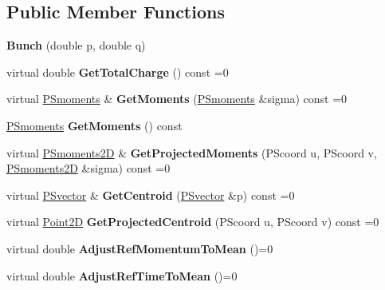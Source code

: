 \subsection*{Public Member Functions}
\begin{DoxyCompactItemize}
\item 
\mbox{\label{classBunch_a8bfec1887f57505cafcad9a0acf6d3ca}} 
{\bfseries Bunch} (double p, double q)
\item 
\mbox{\label{classBunch_a946942aa6a7404ce13b5103abc7a3dfe}} 
virtual double {\bfseries Get\+Total\+Charge} () const =0
\item 
\mbox{\label{classBunch_a204ba650bb0ff67d7fd75477da70766f}} 
virtual \hyperlink{classTPSMoments}{P\+Smoments} \& {\bfseries Get\+Moments} (\hyperlink{classTPSMoments}{P\+Smoments} \&sigma) const =0
\item 
\mbox{\label{classBunch_a9262fb601fe43bffc9cb2debd5ffdb73}} 
\hyperlink{classTPSMoments}{P\+Smoments} {\bfseries Get\+Moments} () const
\item 
\mbox{\label{classBunch_a77d7e164f04dd31d73f7f1014fb8feec}} 
virtual \hyperlink{classTPSMoments_3_011_01_4}{P\+Smoments2D} \& {\bfseries Get\+Projected\+Moments} (P\+Scoord u, P\+Scoord v, \hyperlink{classTPSMoments_3_011_01_4}{P\+Smoments2D} \&sigma) const =0
\item 
\mbox{\label{classBunch_a0259dd62c200a2f6df6595cb352bebca}} 
virtual \hyperlink{classPSvector}{P\+Svector} \& {\bfseries Get\+Centroid} (\hyperlink{classPSvector}{P\+Svector} \&p) const =0
\item 
\mbox{\label{classBunch_a5ccc9ef2f9ff77b09bd7b4a636975455}} 
virtual \hyperlink{classTVec2D}{Point2D} {\bfseries Get\+Projected\+Centroid} (P\+Scoord u, P\+Scoord v) const =0
\item 
\mbox{\label{classBunch_a37ff416d2fab31ab4db21e10662529d8}} 
virtual double {\bfseries Adjust\+Ref\+Momentum\+To\+Mean} ()=0
\item 
\mbox{\label{classBunch_a350e2213fc71673b56ad3570aaa7674a}} 
virtual double {\bfseries Adjust\+Ref\+Time\+To\+Mean} ()=0

\end{DoxyCompactItemize}
